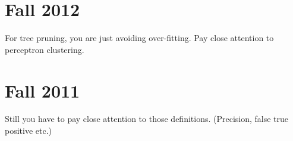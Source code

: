 \documentclass[12pt]{article}
\begin{document}
\section{Fall 2012}
\label{sec:fall-2012}

For tree pruning, you are just avoiding over-fitting.
Pay close attention to perceptron clustering.


\section{Fall 2011}
\label{sec:fall-2011}
Still you have to pay close attention to those
definitions. (Precision, false true positive etc.)
\end{document}
